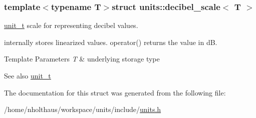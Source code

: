 \subsubsection*{template$<$typename T$>$struct units\+::decibel\+\_\+scale$<$ T $>$}

\hyperlink{classunits_1_1unit__t}{unit\+\_\+t} scale for representing decibel values. 

internally stores linearized values. {\ttfamily operator()} returns the value in d\+B. 
\begin{DoxyTemplParams}{Template Parameters}
{\em T} & underlying storage type \\
\hline
\end{DoxyTemplParams}
\begin{DoxySeeAlso}{See also}
\hyperlink{classunits_1_1unit__t}{unit\+\_\+t} 
\end{DoxySeeAlso}


The documentation for this struct was generated from the following file\+:\begin{DoxyCompactItemize}
\item 
/home/nholthaus/workspace/units/include/\hyperlink{units_8h}{units.\+h}\end{DoxyCompactItemize}
